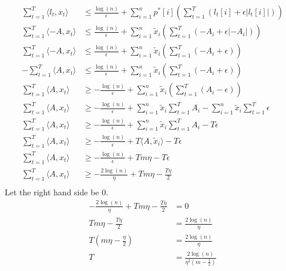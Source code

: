 \documentclass[11pt]{article}
\newenvironment{qparts}{\begin{enumerate}[{(}a{)}]}{\end{enumerate}}
\begin{document}
\begin{qparts}
	\begin{align*}
		\sum_{t=1}^T \langle l_t,x_t \rangle
		&\le
		\frac{\log(n)}{\epsilon} + \sum_{i=1}^n p^*[i]( \sum_{t=1}^T(l_t[i] + \epsilon | l_t[i] | )) \\
		\sum_{t=1}^T \langle -A,x_t \rangle
		&\le
		\frac{\log(n)}{\epsilon} + \sum_{i=1}^n \widetilde x_i( \sum_{t=1}^T(-A_i + \epsilon | -A_i | )) \\
		\sum_{t=1}^T \langle -A,x_t \rangle
		&\le
		\frac{\log(n)}{\epsilon} + \sum_{i=1}^n \widetilde x_i( \sum_{t=1}^T(-A_i + \epsilon)) \\
		-\sum_{t=1}^T \langle A,x_t \rangle
		&\le
		\frac{\log(n)}{\epsilon} + \sum_{i=1}^n \widetilde x_i( \sum_{t=1}^T(-A_i + \epsilon)) \\
		\sum_{t=1}^T \langle A,x_t \rangle
		&\ge
		-\frac{\log(n)}{\epsilon} + \sum_{i=1}^n \widetilde x_i( \sum_{t=1}^T(A_i - \epsilon)) \\
		\sum_{t=1}^T \langle A,x_t \rangle
		&\ge
		-\frac{\log(n)}{\epsilon} 
		+ \sum_{i=1}^n \widetilde x_i \sum_{t=1}^T A_i 
		-  \sum_{i=1}^n \widetilde x_i \sum_{t=1}^T \epsilon \\
		\sum_{t=1}^T \langle A,x_t \rangle
		&\ge
		-\frac{\log(n)}{\epsilon} 
		+ \sum_{i=1}^n \widetilde x_i \sum_{t=1}^T A_i 
		- T \epsilon \\
		\sum_{t=1}^T \langle A,x_t \rangle
		&\ge
		-\frac{\log(n)}{\epsilon} 
		+ T \langle A,\widetilde x_i \rangle
		- T \epsilon \\
		\sum_{t=1}^T \langle A,x_t \rangle
		&\ge
		-\frac{\log(n)}{\epsilon} 
		+ T m\eta
		- T \epsilon \\
		\sum_{t=1}^T \langle A,x_t \rangle
		&\ge
		-\frac{2\log(n)}{\eta} 
		+ T m\eta
		- \frac{T \eta}{2} \\
	\end{align*}
	Let the right hand side be 0.
	\begin{align*}
		-\frac{2\log(n)}{\eta} 
		+ T m\eta
		- \frac{T \eta}{2} 
		&=
		0 \\
		T m\eta
		- \frac{T \eta}{2} 
		&=
		\frac{2\log(n)}{\eta}  \\
		T(m\eta - \frac{\eta}{2})
		&=
		\frac{2\log(n)}{\eta}  \\
		T
		&=
		\frac{2\log(n)}{\eta^2(m - \frac{1}{2})}  \\	
	\end{align*}
\end{qparts}
\end{document}
